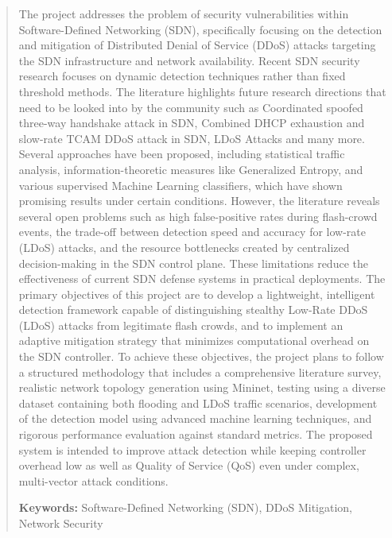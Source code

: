 \documentclass[12pt,a4paper]{article}
\begin{document}
\begin{abstract}
The project addresses the problem of security vulnerabilities within
Software-Defined Networking (SDN), specifically focusing on the detection and
mitigation of Distributed Denial of Service (DDoS) attacks targeting the SDN
infrastructure and network availability. Recent SDN security research focuses on
dynamic detection techniques rather than fixed threshold methods. The literature
highlights future research directions that need to be looked into by the
community such as Coordinated spoofed three-way handshake attack in SDN,
Combined DHCP exhaustion and slow-rate TCAM DDoS attack in SDN, LDoS Attacks and
many more. Several approaches have been proposed, including statistical traffic
analysis, information-theoretic measures like Generalized Entropy, and various
supervised Machine Learning classifiers, which have shown promising results under
certain conditions. However, the literature reveals several open problems such as
high false-positive rates during flash-crowd events, the trade-off between
detection speed and accuracy for low-rate (LDoS) attacks, and the resource
bottlenecks created by centralized decision-making in the SDN control plane.
These limitations reduce the effectiveness of current SDN defense systems in
practical deployments. The primary objectives of this project are to develop a
lightweight, intelligent detection framework capable of distinguishing stealthy
Low-Rate DDoS (LDoS) attacks from legitimate flash crowds, and to implement an
adaptive mitigation strategy that minimizes computational overhead on the SDN
controller. To achieve these objectives, the project plans to follow a structured
methodology that includes a comprehensive literature survey, realistic network
topology generation using Mininet, testing using a diverse dataset containing
both flooding and LDoS traffic scenarios, development of the detection model
using advanced machine learning techniques, and rigorous performance evaluation
against standard metrics. The proposed system is intended to improve attack
detection while keeping controller overhead low as well as Quality of Service
(QoS) even under complex, multi-vector attack conditions.

\vspace{1em}
\noindent\textbf{Keywords:} Software-Defined Networking (SDN), DDoS Mitigation,
Network Security
\end{abstract}
\end{document}
